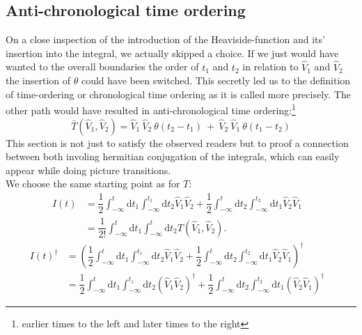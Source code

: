 \documentclass[12pt, titlepage]{article}
\begin{document}
\begin{subappendices}
\subsection{Anti-chronological time ordering}\label{anti_chronological_time}
On a close inspection of the introduction of the Heaviside-function and its' insertion into the integral, we actually skipped a choice. If we just would have wanted to the overall boundaries the order of $ t_1 $ and $ t_2 $ in relation to $ \hat{V}_1 $ and $ \hat{V}_2 $ the insertion of $  \theta$  could have been switched. This secretly led us to the definition of time-ordering or chronological time ordering as it is called more precisely. The other path would have resulted in anti-chronological time ordering:\footnote{
earlier times to the left and later times to the right
}
\begin{equation}\label{anti_o}
 \bar{T}(\hat{V}_1,\hat{V}_2)
 =
 \hat{V}_1\ \hat{V}_2\ \theta (t_2 -t_1)\ +\ \hat{V}_2\  \hat{V}_1 \ \theta (t_1-t_2)
\end{equation} 
This section is not just to satisfy the observed readers but to proof a connection between both involing hermitian conjugation of the integrals, which can easily appear while doing picture transitions.
\\
We choose the same starting point as for $ T $:
\begin{align*}
  I(t)
  &= \dfrac{1}{2}
	 \int_{-\infty}^{t}\mathrm{d}t_1\int_{-\infty}^{t_1}\! \! \mathrm{d}t_2
	 \hat{V}_1 \hat{V}_2
	+
	\dfrac{1}{2}
	\int_{-\infty}^{t}\mathrm{d}t_2\int_{-\infty}^{t_2}\! \! \mathrm{d}t_1
	\hat{V}_2 \hat{V}_1
	 &\\
  &= \dfrac{1}{2!}
	 \int_{-\infty}^{t}\mathrm{d}t_1\int_{-\infty}^{t}\! \! \mathrm{d}t_2
	 T(\hat{V}_1,\hat{V}_2).
\end{align*}
\begin{subequations}
\begin{align}
  I(t)^{\dagger}
  &=\left(  \dfrac{1}{2}
	 \int_{-\infty}^{t}\mathrm{d}t_1\int_{-\infty}^{t_1}\! \! \mathrm{d}t_2
	 \hat{V}_1 \hat{V}_2
	+
	\dfrac{1}{2}
	\int_{-\infty}^{t}\mathrm{d}t_2\int_{-\infty}^{t_2}\! \! \mathrm{d}t_1
	\hat{V}_2 \hat{V}_1
	\right) ^{\dagger}
	 &\\
  &=  \dfrac{1}{2}
	 \int_{-\infty}^{t}\mathrm{d}t_1\int_{-\infty}^{t_1}\! \! \mathrm{d}t_2
	 \left(\hat{V}_1 \hat{V}_2\right) ^{\dagger}
	+
	\dfrac{1}{2}
	\int_{-\infty}^{t}\mathrm{d}t_2\int_{-\infty}^{t_2}\! \! \mathrm{d}t_1
	\left( \hat{V}_2 \hat{V}_1\right) ^{\dagger}

\end{align}
\end{subequations}
\end{subappendices}
\end{document}
